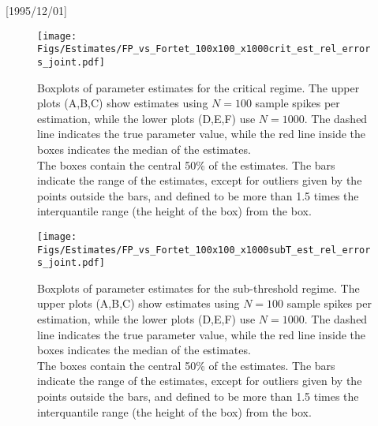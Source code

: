 \NeedsTeXFormat{LaTeX2e}[1995/12/01] \documentclass[10pt]{bmc_article}
\newenvironment{bmcformat}{\begin{raggedright}\baselineskip20pt\sloppy\setboolean{publ}{false}}{\end{raggedright}\baselineskip20pt\sloppy}
\begin{document}
\begin{bmcformat}
\begin{figure}[p]
\end{figure}
\begin{figure}[p]
\begin{center}
\texttt{[image: Figs/Estimates/FP\_vs\_Fortet\_100x100\_x1000crit\_est\_rel\_errors\_joint.pdf]}
\caption{Boxplots of parameter estimates for the
critical regime.
The upper plots (A,B,C) show estimates using $N=100$ sample spikes per
estimation, while the lower plots (D,E,F) use $N=1000$. The dashed line
indicates the true parameter value, while the red line inside the boxes
indicates the median of the estimates.
\\
The boxes contain the central 50\% of the estimates. The bars indicate
the range of the estimates, except for outliers given by the points
outside the bars, and defined to be more than 1.5 times the
interquantile range (the height of the box) from the box.}  
\label{fig:comprehensive_test_crit_relerrors}
\end{center}    
\end{figure} 
\begin{figure}[p]  
\begin{center}
\texttt{[image: Figs/Estimates/FP\_vs\_Fortet\_100x100\_x1000subT\_est\_rel\_errors\_joint.pdf]}
\caption{Boxplots of parameter estimates for the 
sub-threshold regime.
The upper plots (A,B,C) show estimates using $N=100$ sample spikes per
estimation, while the lower plots (D,E,F) use $N=1000$. The dashed line
indicates the true parameter value, while the red line inside the boxes
indicates the median of the estimates.
\\
The boxes contain the central 50\% of the estimates. The bars indicate
the range of the estimates, except for outliers given by the points
outside the bars, and defined to be more than 1.5 times the
interquantile range (the height of the box) from the box.}
\label{fig:comprehensive_test_SubT_relerrors}

\end{center}
\end{figure}
\end{bmcformat}
\end{document}
